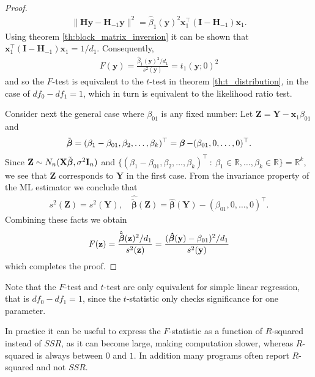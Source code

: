 \begin{proof}
    \begin{align*}
        \|\textbf{H}\textbf{y} - \textbf{H}_{-1}\textbf{y}\|^2 = \hat{\beta}_1(\textbf{y})^2\textbf{x}_1^\top(\textbf{I} - \textbf{H}_{-1})\textbf{x}_1.
    \end{align*}
    Using theorem \ref{th:block_matrix_inversion} it can be shown that $\textbf{x}_1^\top(\textbf{I} - \textbf{H}_{-1})\textbf{x}_1 = 1/d_1$.
    Consequently,
    \begin{align*}
         F(\textbf{y}) = \frac{\hat{\beta}_1(\textbf{y})^2/d_1}{s^2(\textbf{y})} =  t_1(\textbf{y};0)^2
    \end{align*}
    and so the $F$-test is equivalent to the $t$-test in theorem \ref{th:t_distribution}, in the case of $df_0 - df_1=1$, which in turn is equivalent to the likelihood ratio test.
    
    Consider next the general case where $\beta_{01}$ is any fixed number: Let $\textbf{Z} = \textbf{Y} - \textbf{x}_1\beta_{01}$ and
    \begin{align*}
        \Tilde{\operatorname{\boldsymbol{\beta}}} = (\beta_1 - \beta_{01}, \beta_2, \ldots, \beta_k)^\top = \operatorname{\boldsymbol{\beta}} - (\beta_{01}, 0, \ldots, 0)^\top.
    \end{align*}
    Since $\textbf{Z} \sim N_n(\textbf{X}\Tilde{\boldsymbol{\beta}}, \sigma^2\textbf{I}_n)$ and $\{ (\beta_1 - \beta_{01}, \beta_2, \ldots, \beta_k)^\top \: : \: \beta_1 \in \mathbb{R}, \ldots, \beta_k \in \mathbb{R} \} = \mathbb{R}^k$, we see that $\textbf{Z}$ corresponds to $\textbf{Y}$ in the first case.
    From the invariance property of the ML estimator we conclude that
    \begin{align*}
        s^2(\textbf{Z}) = s^2(\textbf{Y}), \quad \hat{\tilde{\boldsymbol{\beta}}}(\textbf{Z}) = \hat{\boldsymbol{\beta}}(\textbf{Y}) - (\beta_{01}, 0, \ldots, 0)^\top.
    \end{align*}
    Combining these facts we obtain
    \begin{align*}
        F(\textbf{z}) =
        \frac{\hat{\tilde{\boldsymbol{\beta}}}(\textbf{z})^2/d_1}{s^2(\textbf{z})} = 
        \frac{(\operatorname{\boldsymbol{\hat{\beta}}}(\textbf{y}) - \beta_{01})^2/d_1}{s^2(\textbf{y})}
    \end{align*}
    which completes the proof.
\end{proof}

Note that the $F$-test and $t$-test are only equivalent for simple linear regression, that is $df_0 - df_1 = 1$, since the $t$-statistic only checks significance for one parameter.

In practice it can be useful to express the $F$-statistic as a function of $R$-squared instead of $SSR$, as it can become large, making computation slower, whereas $R$-squared is always between $0$ and $1$. In addition many programs often report $R$-squared and not $SSR$.

